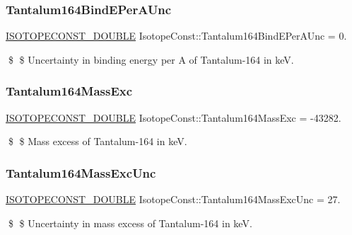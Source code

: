 \subsubsection{\texorpdfstring{Tantalum164\+Bind\+E\+Per\+A\+Unc}{Tantalum164BindEPerAUnc}}
{\footnotesize\ttfamily \mbox{\hyperlink{group___isotope_const-_macros_ga8f45a7272ce02c0b4c65c44636ed719a}{I\+S\+O\+T\+O\+P\+E\+C\+O\+N\+S\+T\+\_\+\+D\+O\+U\+B\+LE}} Isotope\+Const\+::\+Tantalum164\+Bind\+E\+Per\+A\+Unc = 0.}

\$ \$ Uncertainty in binding energy per A of Tantalum-\/164 in keV. \mbox{\label{group___isotope_const-_tantalum-_ta164_gab3be3730cb7226565f2d2d68acb64138}} 
\subsubsection{\texorpdfstring{Tantalum164\+Mass\+Exc}{Tantalum164MassExc}}
{\footnotesize\ttfamily \mbox{\hyperlink{group___isotope_const-_macros_ga8f45a7272ce02c0b4c65c44636ed719a}{I\+S\+O\+T\+O\+P\+E\+C\+O\+N\+S\+T\+\_\+\+D\+O\+U\+B\+LE}} Isotope\+Const\+::\+Tantalum164\+Mass\+Exc = -\/43282.}

\$ \$ Mass excess of Tantalum-\/164 in keV. \mbox{\label{group___isotope_const-_tantalum-_ta164_ga120ab02aa2e09f65f77483bdb59e263b}} 
\subsubsection{\texorpdfstring{Tantalum164\+Mass\+Exc\+Unc}{Tantalum164MassExcUnc}}
{\footnotesize\ttfamily \mbox{\hyperlink{group___isotope_const-_macros_ga8f45a7272ce02c0b4c65c44636ed719a}{I\+S\+O\+T\+O\+P\+E\+C\+O\+N\+S\+T\+\_\+\+D\+O\+U\+B\+LE}} Isotope\+Const\+::\+Tantalum164\+Mass\+Exc\+Unc = 27.}

\$ \$ Uncertainty in mass excess of Tantalum-\/164 in keV. \mbox{\label{group___isotope_const-_tantalum-_ta164_ga2b1ce994cc1aa6ddab61cd9e4870a3e5}} 
